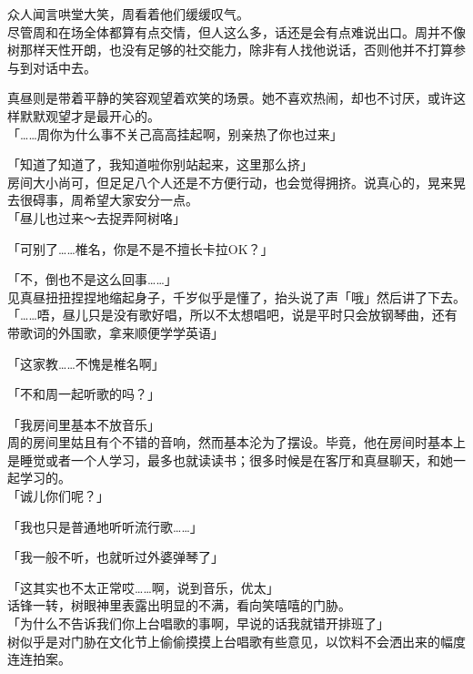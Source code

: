 众人闻言哄堂大笑，周看着他们缓缓叹气。\\

尽管周和在场全体都算有点交情，但人这么多，话还是会有点难说出口。周并不像树那样天性开朗，也没有足够的社交能力，除非有人找他说话，否则他并不打算参与到对话中去。

真昼则是带着平静的笑容观望着欢笑的场景。她不喜欢热闹，却也不讨厌，或许这样默默观望才是最开心的。\\

「……周你为什么事不关己高高挂起啊，别亲热了你也过来」

「知道了知道了，我知道啦你别站起来，这里那么挤」\\

房间大小尚可，但足足八个人还是不方便行动，也会觉得拥挤。说真心的，晃来晃去很碍事，周希望大家安分一点。\\

「昼儿也过来～去捉弄阿树咯」

「可别了……椎名，你是不是不擅长卡拉OK？」

「不，倒也不是这么回事……」\\

见真昼扭扭捏捏地缩起身子，千岁似乎是懂了，抬头说了声「哦」然后讲了下去。\\

「……唔，昼儿只是没有歌好唱，所以不太想唱吧，说是平时只会放钢琴曲，还有带歌词的外国歌，拿来顺便学学英语」

「这家教……不愧是椎名啊」

「不和周一起听歌的吗？」

「我房间里基本不放音乐」\\

周的房间里姑且有个不错的音响，然而基本沦为了摆设。毕竟，他在房间时基本上是睡觉或者一个人学习，最多也就读读书；很多时候是在客厅和真昼聊天，和她一起学习的。\\

「诚儿你们呢？」

「我也只是普通地听听流行歌……」

「我一般不听，也就听过外婆弹琴了」

「这其实也不太正常哎……啊，说到音乐，优太」\\

话锋一转，树眼神里表露出明显的不满，看向笑嘻嘻的门胁。\\

「为什么不告诉我们你上台唱歌的事啊，早说的话我就错开排班了」\\

树似乎是对门胁在文化节上偷偷摸摸上台唱歌有些意见，以饮料不会洒出来的幅度连连拍案。

